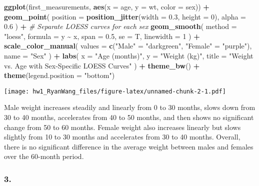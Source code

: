 \documentclass[
]{article}
\newenvironment{Shaded}{\begin{snugshade}}{\end{snugshade}}
\newcommand{\AttributeTok}[1]{\textcolor[rgb]{0.13,0.29,0.53}{#1}}
\newcommand{\CommentTok}[1]{\textcolor[rgb]{0.56,0.35,0.01}{\textit{#1}}}
\newcommand{\DecValTok}[1]{\textcolor[rgb]{0.00,0.00,0.81}{#1}}
\newcommand{\FloatTok}[1]{\textcolor[rgb]{0.00,0.00,0.81}{#1}}
\newcommand{\FunctionTok}[1]{\textcolor[rgb]{0.13,0.29,0.53}{\textbf{#1}}}
\newcommand{\NormalTok}[1]{#1}
\newcommand{\OtherTok}[1]{\textcolor[rgb]{0.56,0.35,0.01}{#1}}
\newcommand{\SpecialCharTok}[1]{\textcolor[rgb]{0.81,0.36,0.00}{\textbf{#1}}}
\newcommand{\StringTok}[1]{\textcolor[rgb]{0.31,0.60,0.02}{#1}}
\begin{document}
\begin{Shaded}
\begin{Highlighting}[]
\FunctionTok{ggplot}\NormalTok{(first\_measurements, }\FunctionTok{aes}\NormalTok{(}\AttributeTok{x =}\NormalTok{ age, }\AttributeTok{y =}\NormalTok{ wt, }\AttributeTok{color =}\NormalTok{ sex)) }\SpecialCharTok{+}
  \FunctionTok{geom\_point}\NormalTok{(}
    \AttributeTok{position =} \FunctionTok{position\_jitter}\NormalTok{(}\AttributeTok{width =} \FloatTok{0.3}\NormalTok{, }\AttributeTok{height =} \DecValTok{0}\NormalTok{),}
    \AttributeTok{alpha =} \FloatTok{0.6}
\NormalTok{  ) }\SpecialCharTok{+}
  \CommentTok{\# Separate LOESS curves for each sex}
  \FunctionTok{geom\_smooth}\NormalTok{(}
    \AttributeTok{method =} \StringTok{"loess"}\NormalTok{,}
    \AttributeTok{formula =}\NormalTok{ y }\SpecialCharTok{\textasciitilde{}}\NormalTok{ x,}
    \AttributeTok{span =} \FloatTok{0.5}\NormalTok{,}
    \AttributeTok{se =}\NormalTok{ T,  }
    \AttributeTok{linewidth =} \DecValTok{1} 
\NormalTok{  ) }\SpecialCharTok{+}
  \FunctionTok{scale\_color\_manual}\NormalTok{(}
    \AttributeTok{values =} \FunctionTok{c}\NormalTok{(}\StringTok{"Male"} \OtherTok{=} \StringTok{"darkgreen"}\NormalTok{, }\StringTok{"Female"} \OtherTok{=} \StringTok{"purple"}\NormalTok{), }
    \AttributeTok{name =} \StringTok{"Sex"}
\NormalTok{  ) }\SpecialCharTok{+}
  \FunctionTok{labs}\NormalTok{(}
    \AttributeTok{x =} \StringTok{"Age (months)"}\NormalTok{,}
    \AttributeTok{y =} \StringTok{"Weight (kg)"}\NormalTok{,}
    \AttributeTok{title =} \StringTok{"Weight vs. Age with Sex{-}Specific LOESS Curves"}
\NormalTok{  ) }\SpecialCharTok{+}
  \FunctionTok{theme\_bw}\NormalTok{() }\SpecialCharTok{+}
  \FunctionTok{theme}\NormalTok{(}\AttributeTok{legend.position =} \StringTok{"bottom"}\NormalTok{)}
\end{Highlighting}
\end{Shaded}

\texttt{[image: hw1\_RyanWang\_files/figure-latex/unnamed-chunk-2-1.pdf]}

Male weight increases steadily and linearly from 0 to 30 months, slows
down from 30 to 40 months, accelerates from 40 to 50 months, and then
shows no significant change from 50 to 60 months. Female weight also
increases linearly but slows slightly from 10 to 30 months and
accelerates from 30 to 40 months. Overall, there is no significant
difference in the average weight between males and females over the
60-month period.

\subsubsection{3.}\label{section-1}
\end{document}
